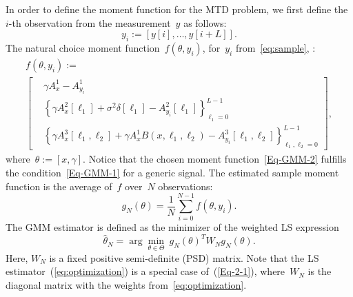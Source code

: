 \documentclass{article}
\newcommand{\rev}[1]{{\color{magenta}{#1}}}
\begin{document}
In order to define the moment function for the MTD problem, we first define the $i$-th observation from the measurement~$y$ as follows:
\begin{equation}\label{eq:sample}
	y_i := [y[i],\ldots, y[i+L]].
\end{equation}
The natural choice \rev{of a} moment function~$f(\theta, y_i)$, for~$y_i$ from~\eqref{eq:sample}, \rev{is the discrepancy between the autocorrelations of~$y_i$ and the population autocorrelations}:
\begin{multline} \label{Eq-GMM-2}
	f(\theta, y_i) := \\
	\begin{bmatrix}
		&\gamma A_x^1 - A_{y_i}^1\\
		&\left\{\gamma A_x^2[\ell_1] + \sigma^2 \delta[\ell_1] - A_{y_i}^2 [\ell_1]\right\}_{\ell_1 = 0}^{L-1} \\
		&\left\{\gamma A_x^3[\ell_1, \ell_2] + \gamma A_{x}^1 B(x, \ell_1, \ell_2) - A_{y_i}^3[\ell_1, \ell_2]\right\}_{\ell_1, \ell_2 = 0}^{L-1}
	\end{bmatrix},
\end{multline}
where~\mbox{$\theta := [x, \gamma]$}. Notice that the chosen moment function~\eqref{Eq-GMM-2} fulfills the \rev{uniqueness} condition~\eqref{Eq-GMM-1} for a generic signal. The estimated sample moment function is the average of~$f$ over~$N$ observations:
\begin{equation}\label{Eq-2-5}
	g_N(\theta) = \frac{1}{N} \sum_{i = 0}^{N - 1} f(\theta, y_i).
\end{equation}
The GMM estimator is defined as the minimizer of the weighted LS expression
\begin{equation} \label{eq:opt_theta}
	\hat{\theta}_N = \arg\min_{\theta \in \Theta} \ g_N(\theta)^T W_N g_N(\theta).
\end{equation}
Here, $W_N$ is a fixed positive semi-definite (PSD) matrix. Note that the LS estimator~(\ref{eq:optimization}) is a special case of~(\ref{Eq-2-1}), where~$W_N$ is the diagonal matrix with the weights from~\eqref{eq:optimization}.
\end{document}
